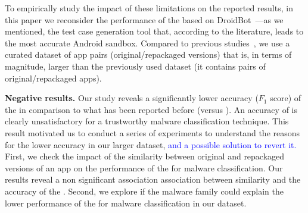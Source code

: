 

To empirically study the impact of these limitations on the reported results, in this paper we reconsider the performance of the \mas based on
DroidBot~\cite{DBLP:conf/icse/LiYGC17}---as we mentioned, the test case generation tool that, according to the literature, leads to the most accurate Android sandbox. 
Compared to previous studies~\cite{DBLP:conf/wcre/BaoLL18,DBLP:conf/scam/CostaMCMVBC20},
we use a curated dataset of app pairs (original/repackaged versions) that is, in terms of magnitude, larger than the previously used
dataset (it contains \apps pairs of original/repackaged apps).
 
{\bf Negative results.} Our study reveals a significantly lower
accuracy ($F_1$ score) of the \mas in comparison to what has been reported before (\fscore versus \fscoreSmall). 
An accuracy of \fscore is clearly unsatisfactory for a trustworthy malware classification technique.
This result motivated us to conduct a series of experiments 
to understand the reasons for the lower accuracy in our larger dataset, \textcolor{blue}{and a possible solution to revert it.}
First, we check the impact of the similarity between original and repackaged versions of
an app on the performance of the \mas for malware classification. Our results reveal a non significant association association between similarity and the accuracy of the \mas. 
Second, we explore if the
malware family could explain the lower performance of the \mas for malware classification in 
our dataset.

